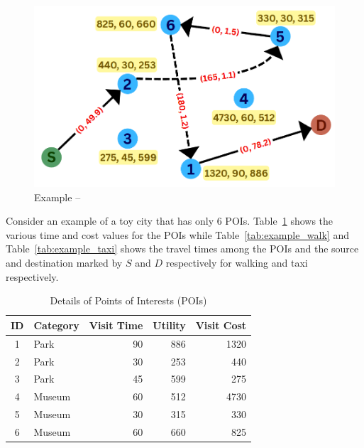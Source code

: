 \begin{figure}[t]
	\centering
	\includegraphics[width=0.75\columnwidth]{plots/updatedExample.png}
	\caption{Example -- }
	\label{fig:example_graph}
\end{figure}

Consider an example of a toy city that has only 6 POIs.
Table~\ref{tab:example_poi} shows the various time and cost values for
the POIs while Table~\ref{tab:example_walk} and
Table~\ref{tab:example_taxi} shows the travel times among the POIs and
the source and destination marked by $S$ and $D$ respectively for
walking and taxi respectively.

\begin{table}[t]
	\centering
	\resizebox{0.85\columnwidth}{!}
	{
		\begin{tabular}{c l rrr}
			\toprule
			\textbf{ID} & \textbf{Category} & \textbf{Visit Time} & \textbf{Utility} & \textbf{Visit Cost} \\
			\midrule
			1 & Park        & 90 & 886 & 1320 \\
			2 & Park        & 30 & 253 & 440  \\
			3 & Park        & 45 & 599 & 275  \\
			4 & Museum      & 60 & 512 & 4730 \\
			5 & Museum      & 30 & 315 & 330  \\
			6 & Museum      & 60 & 660 & 825  \\
			\bottomrule
		\end{tabular}
	}
	\caption{Details of Points of Interests (POIs)}
	\label{tab:example_poi}
\end{table}

